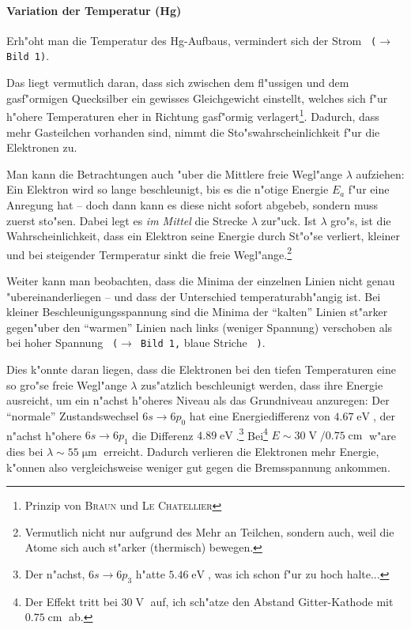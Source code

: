 \documentclass[a4paper,12pt]{article}
\newcommand{\bild}[1]{\texttt{ ($\rightarrow$ Bild #1)}}
\newcommand{\bildd}[2]{\texttt{ ($\rightarrow$ Bild #1,} #2 \texttt{ )}}
\begin{document}
\paragraph{Variation der Temperatur (Hg)}
\label{sec:variation_der_temperatur}

Erh"oht man die Temperatur des Hg-Aufbaus, vermindert sich der Strom
\bild 1.

Das liegt vermutlich daran, dass sich zwischen dem fl"ussigen und dem
gasf"ormigen Quecksilber ein gewisses Gleichgewicht einstellt, welches
sich f"ur h"ohere Temperaturen eher in Richtung gasf"ormig
verlagert\footnote{Prinzip von \textsc{Braun} und \textsc{Le
    Chatellier}}. Dadurch, dass mehr Gasteilchen vorhanden sind, nimmt
die Sto"swahrscheinlichkeit f"ur die Elektronen zu.

Man kann die Betrachtungen auch "uber die Mittlere freie Wegl"ange
$\lambda$ aufziehen: Ein Elektron wird so lange beschleunigt, bis es
die n"otige Energie $E_a$ f"ur eine Anregung hat -- doch dann kann es
diese nicht sofort abgebeb, sondern muss zuerst sto"sen. Dabei legt es
\emph{im Mittel} die Strecke $\lambda$ zur"uck. Ist $\lambda$ gro"s,
ist die Wahrscheinlichkeit, dass ein Elektron seine Energie durch
St"o"se verliert, kleiner und bei steigender Termperatur sinkt die
freie Wegl"ange.\footnote{Vermutlich nicht nur aufgrund des Mehr an
  Teilchen, sondern auch, weil die Atome sich auch st"arker
  (thermisch) bewegen.}

Weiter kann man beobachten, dass die Minima der einzelnen Linien nicht
genau "ubereinanderliegen -- und dass der Unterschied
temperaturabh"angig ist. Bei kleiner Beschleunigungsspannung sind die Minima der
"`kalten"' Linien st"arker gegen"uber den "`warmen"' Linien nach links
(weniger Spannung) verschoben als bei hoher Spannung \bildd 1 {blaue
  Striche}.

Dies k"onnte daran liegen, dass die Elektronen bei den tiefen
Temperaturen eine so gro"se freie Wegl"ange $\lambda$ zus"atzlich
beschleunigt werden, dass ihre Energie ausreicht, um ein n"achst
h"oheres Niveau als das Grundniveau anzuregen: Der "`normale"'
Zustandswechsel $6s \to 6p_0$ hat eine Energiedifferenz von
$4.67\operatorname{eV}$, der n"achst h"ohere $6s \to 6p_1$ die
Differenz $4.89\operatorname{eV}$.\footnote{Der n"achst, $6s \to 6p_3$
  h"atte $5.46\operatorname{eV}$, was ich schon f"ur zu hoch halte...}
Bei\footnote{Der Effekt tritt bei $30\operatorname{V}$ auf, ich
  sch"atze den Abstand Gitter-Kathode mit $0.75\operatorname{cm}$ ab.}  $E \sim 30\operatorname{V}/0.75\operatorname{cm}$ w"are dies bei
$\lambda \sim 55\operatorname{\mu m}$ erreicht.  Dadurch verlieren die
Elektronen mehr Energie, k"onnen also vergleichsweise weniger gut
gegen die Bremsspannung ankommen.
\end{document}
